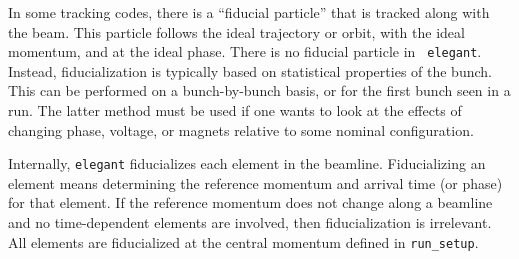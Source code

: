 \documentclass[11pt]{article}
\begin{document}
In some tracking codes, there is a ``fiducial particle'' that is
tracked along with the beam.  This particle follows the ideal trajectory or orbit, with the ideal
momentum, and at the ideal phase.  There is no fiducial particle in {\tt
elegant}.  Instead, fiducialization is typically based on statistical properties of 
the bunch.  This can be performed on a bunch-by-bunch basis, or for the first
bunch seen in a run.  The latter method must be used if one wants to look at the
effects of changing phase, voltage, or magnets relative to some nominal configuration.

Internally, {\tt elegant} fiducializes each element in the beamline.
Fiducializing an element means determining the reference momentum and arrival time
(or phase) for that element.   If the reference momentum does not change along a beamline and no time-dependent elements
are involved, then fiducialization is irrelevant.  All elements are
fiducialized at the central momentum defined in \verb|run_setup|.
\end{document}
